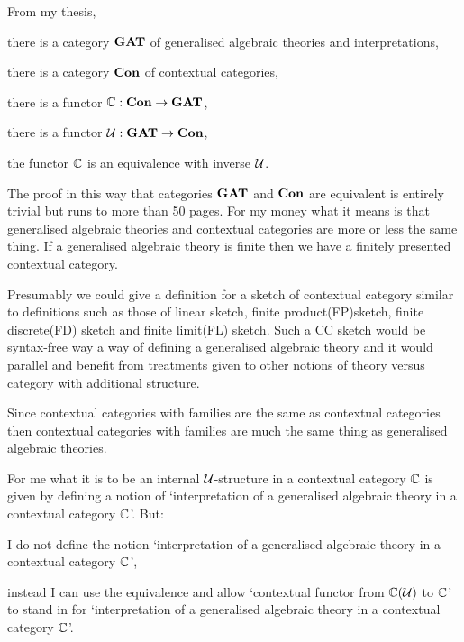 
\note From my thesis, 
\begin{point}
there is a category $\catGAT$ of generalised algebraic theories and interpretations,
\end{point}
\begin{point}
there is a category $\catCon$ of contextual categories,
\end{point}
\begin{point}
there is a functor $\ccat[C]: \catCon \morph \catGAT$,
\end{point}
\begin{point}
there is a functor $\gat[U]:\catGAT \morph \catCon$,
\end{point}
\begin{point}
the functor $\ccat[C]$ is an equivalence with inverse $\gat[U]$.
\end{point}

\note
The proof in this way that categories $\catGAT$ and $\catCon$ are equivalent  is entirely trivial but runs to more than 50 pages. For my money what it means is that generalised algebraic theories and contextual categories are more or less the same thing. If a generalised algebraic theory is finite then we have a finitely presented contextual category. 

\note
Presumably we could give a definition for a sketch of contextual category similar to  definitions such as those of linear sketch, finite product(FP)sketch, finite discrete(FD) sketch and finite limit(FL) sketch. Such a CC sketch would be syntax-free way a way of defining a generalised algebraic theory and it would parallel and benefit from treatments given to other notions of theory versus category with additional structure.

\note
Since contextual categories with families are the same as contextual categories then 
contextual categories with families are much the same thing as generalised algebraic theories. 

\note For me what it is to be an internal $\gat[U]$-structure in a contextual category $\ccat[C]$ is given by defining a notion of `interpretation of a generalised algebraic theory \gat[U] in a contextual category $\ccat[C]$'. But:
\begin{point}
I do not define the notion `interpretation of a generalised algebraic theory \gat[U] in a contextual category $\ccat[C]$',
\end{point}
\begin{point}
instead I can use the equivalence and allow
`contextual functor from $\CofU$ to $\ccat[C]$' to stand in for
 `interpretation of a generalised algebraic theory \gat[U] in a contextual category $\ccat[C]$'.
\end{point}

